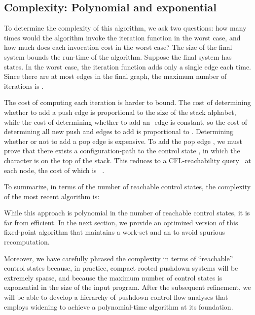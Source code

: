 \subsection{Complexity: Polynomial and exponential}
\label{sec:compl-pol-exp}
 
To determine the complexity of this algorithm, we ask two questions:
how many times would the algorithm invoke the iteration function in
the worst case, and how much does each invocation cost in the
worst case?
The size of the final system bounds the run-time of the algorithm.
Suppose the final system has  states.
In the worst case, the iteration function adds only a single edge each
time.
Since there are at most  edges in the final graph, the maximum
number of iterations is .


The cost of computing each iteration is harder to bound.
The cost of determining whether to add a push edge is proportional to
the size of the stack alphabet, while the cost of determining whether
to add an -edge is constant, so the cost of determining all
new push and  edges to add is proportional to .
Determining whether or not to add a pop edge is expensive.
To add the pop edge
, we must prove that
there exists a configuration-path to the control state , in which
the character  is on the top of the stack.
This reduces to a CFL-reachability query~\cite{mattmight:Melski:2000:CFL}
at each node, the cost of which is ~\cite{dvanhorn:Kodumal2004Set}.

To summarize, in terms of the number of reachable control states, the
complexity of the most recent algorithm is:

While this approach is polynomial in the number of reachable
control states, it is far from efficient.
In the next section, we provide an optimized version of this
fixed-point algorithm that maintains a work-set and an
\ecg{} to avoid spurious recomputation.

Moreover, we have carefully phrased the complexity in terms of
``reachable'' control states because, in practice, compact rooted
pushdown systems will be extremely sparse, and because the maximum
number of control states is exponential in the size of the input
program.
After the subsequent refinement, we will be able to develop a hierarchy of
pushdown control-flow analyses that employs widening to achieve a
polynomial-time algorithm at its foundation.



